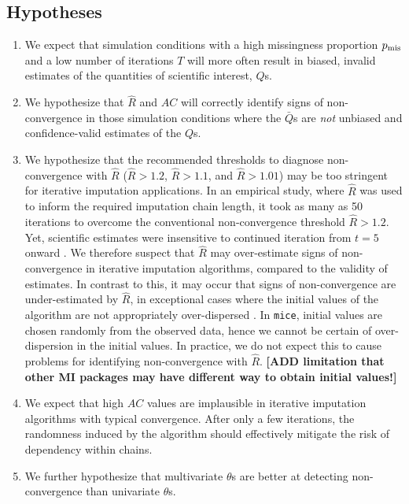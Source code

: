 \documentclass[Royal,times,sageh]{sagej}
\begin{document}
\hypertarget{hypotheses}{%
\subsection{Hypotheses}\label{hypotheses}}

\begin{enumerate}
\def\labelenumi{\arabic{enumi}.}
\item
  We expect that simulation conditions with a high missingness proportion \(p_{\rm mis}\) and a low number of iterations \(T\) will more often result in biased, invalid estimates of the quantities of scientific interest, \(Q\)s.
\item
  We hypothesize that \(\widehat{R}\) and \(AC\) will correctly identify signs of non-convergence in those simulation conditions where the \(\bar{Q}\)s are \emph{not} unbiased and confidence-valid estimates of the \(Q\)s.
\item
  We hypothesize that the recommended thresholds to diagnose non-convergence with \(\widehat{R}\) (\(\widehat{R} > 1.2\), \(\widehat{R} > 1.1\), and \(\widehat{R} > 1.01\)) may be too stringent for iterative imputation applications. In an empirical study, where \(\widehat{R}\) was used to inform the required imputation chain length, it took as many as 50 iterations to overcome the conventional non-convergence threshold \(\widehat{R}>1.2\). Yet, scientific estimates were insensitive to continued iteration from \(t=5\) onward \citep{lace07}. We therefore suspect that \(\widehat{R}\) may over-estimate signs of non-convergence in iterative imputation algorithms, compared to the validity of estimates. In contrast to this, it may occur that signs of non-convergence are under-estimated by \(\widehat{R}\), in exceptional cases where the initial values of the algorithm are not appropriately over-dispersed \citep[p.~437]{broo98}. In \texttt{mice}, initial values are chosen randomly from the observed data, hence we cannot be certain of over-dispersion in the initial values. In practice, we do not expect this to cause problems for identifying non-convergence with \(\widehat{R}\). \textbf{{[}ADD limitation that other MI packages may have different way to obtain initial values!{]}}
\item
  We expect that high \(AC\) values are implausible in iterative imputation algorithms with typical convergence. After only a few iterations, the randomness induced by the algorithm should effectively mitigate the risk of dependency within chains.
\item
  We further hypothesize that multivariate \(\theta\)s are better at detecting non-convergence than univariate \(\theta\)s.
\end{enumerate}
\end{document}
